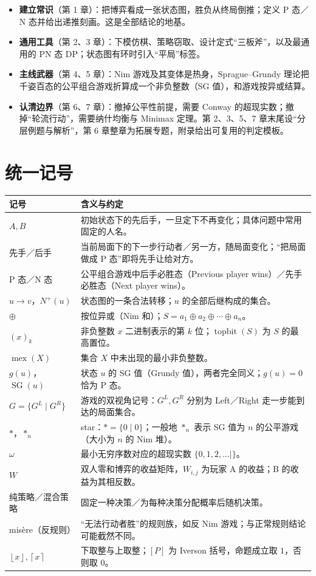 \documentclass[UTF8,a4paper,11pt,oneside,openany,fontset=fandol]{ctexbook}
\theoremstyle{definition}
\newcommand{\mex}{\operatorname{mex}}
\newcommand{\SG}{\operatorname{SG}}
\newcommand{\Np}{N^+}
\newcommand{\topbit}{\operatorname{topbit}}
\newcommand{\floor}[1]{\left\lfloor #1\right\rfloor}
\newcommand{\ceil}[1]{\left\lceil #1\right\rceil}
\newcommand{\iva}[1]{\left[#1\right]}
\begin{document}
\begin{itemize}
\item \textbf{建立常识}（第 1 章）：把博弈看成一张状态图，胜负从终局倒推；定义 P 态／N 态并给出递推刻画。这是全部结论的地基。
\item \textbf{通用工具}（第 2、3 章）：下模仿棋、策略窃取、设计定式“三板斧”，以及最通用的 PN 态 DP；状态图有环时引入“平局”标签。
\item \textbf{主线武器}（第 4、5 章）：Nim 游戏及其变体是热身，Sprague--Grundy 理论把千姿百态的公平组合游戏折算成一个非负整数（SG 值），和游戏按异或结算。
\item \textbf{认清边界}（第 6、7 章）：撤掉公平性前提，需要 Conway 的超现实数；撤掉“轮流行动”，需要纳什均衡与 Minimax 定理。第 2、3、5、7 章末尾设“分层例题与解析”，第 6 章整章为拓展专题，附录给出可复用的判定模板。
\end{itemize}

\section*{统一记号}
\begin{longtable}{p{}p{}}
\toprule
记号 & 含义与约定\\\midrule
$A,B$ & 初始状态下的先后手，一旦定下不再变化；具体问题中常用固定的人名。\\
先手／后手 & 当前局面下的下一步行动者／另一方，随局面变化；“把局面做成 P 态”即将先手让给对方。\\
P 态／N 态 & 公平组合游戏中后手必胜态（Previous player wins）／先手必胜态（Next player wins）。\\
$u\to v$，$\Np(u)$ & 状态图的一条合法转移；$u$ 的全部后继构成的集合。\\
$\oplus$ & 按位异或（Nim 和）；$S=a_1\oplus a_2\oplus\cdots\oplus a_n$。\\
$(x)_k$ & 非负整数 $x$ 二进制表示的第 $k$ 位；$\topbit(S)$ 为 $S$ 的最高置位。\\
$\mex(X)$ & 集合 $X$ 中未出现的最小非负整数。\\
$g(u)$，$\SG(u)$ & 状态 $u$ 的 SG 值（Grundy 值），两者完全同义；$g(u)=0$ 恰为 P 态。\\
$G=\{G^L\mid G^R\}$ & 游戏的双视角记号：$G^L,G^R$ 分别为 Left／Right 走一步能到达的局面集合。\\
$\ast$，$\ast_n$ & star：$\ast=\{0\mid 0\}$；一般地 $\ast_n$ 表示 SG 值为 $n$ 的公平游戏（大小为 $n$ 的 Nim 堆）。\\
$\omega$ & 最小无穷序数对应的超现实数 $\{0,1,2,\ldots\mid\}$。\\
$W$ & 双人零和博弈的收益矩阵，$W_{i,j}$ 为玩家 A 的收益；B 的收益为其相反数。\\
纯策略／混合策略 & 固定一种决策／为每种决策分配概率后随机决策。\\
misère（反规则） & “无法行动者胜”的规则族，如反 Nim 游戏；与正常规则结论可能截然不同。\\
$\floor{x},\ceil{x}$ & 下取整与上取整；$\iva{P}$ 为 Iverson 括号，命题成立取 $1$，否则取 $0$。\\
\bottomrule
\end{longtable}
\end{document}
